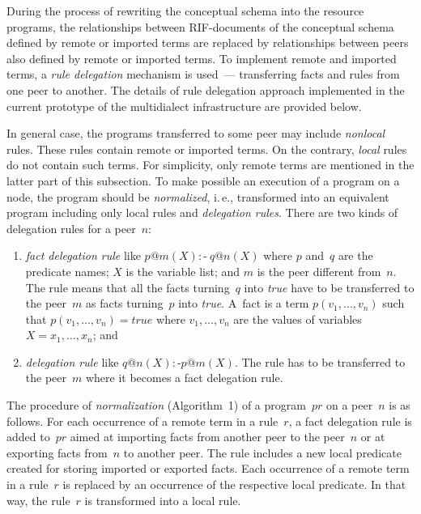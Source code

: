\begin{multicols}{2}
  During the process of rewriting the conceptual schema into the resource
programs, the relationships between RIF-documents of the conceptual schema defined
by remote or imported terms are replaced by relationships between peers also defined
by remote or imported terms. To implement remote and imported terms, a \textit{rule
delegation} mechanism is used~--- transferring facts and rules from one peer to
another. The details of rule delegation approach implemented in the current prototype
of the multidialect infrastructure are provided below.

  In general case, the programs transferred to some peer may include
\textit{nonlocal} rules. These rules contain remote or imported terms. On the
contrary, \textit{local} rules do not contain such terms. For simplicity, only remote
terms are mentioned in the latter part of this subsection. To make possible an execution
of a program on a node, the program should be \textit{normalized}, i.\,e., transformed
into an equivalent program including only local rules and \textit{delegation rules}.
There are two kinds of delegation rules for a peer~$n$:
  \begin{enumerate}[(1)]
\item \textit{fact delegation rule} like $p@m(X) :\mbox{-}\ q@n(X)$ where $p$ and~$q$
are the predicate names; $X$ is the variable list; and $m$ is the
peer different from~$n$. The rule
means that all the facts turning~$q$ into \textit{true} have to be transferred to the
peer~$m$ as facts turning~$p$ into \textit{true}. A~fact is a term $p(v_1,\ldots , v_n)$
such that $p(v_1,\ldots , v_n) = true$ where $v_1,\ldots , v_n$ are the values of
variables~$X = x_1, \ldots , x_n$; and
\item \textit{delegation rule} like $q@n(X) :\mbox{-} p@m(X)$. The rule has to be
transferred to the peer~$m$ where it becomes a fact delegation rule.
\end{enumerate}

  The procedure of \textit{normalization} (Algorithm~1) of a program~$pr$ on a
peer~$n$ is as follows. For each occurrence of a remote term in a rule~$r$, a fact
delegation rule is added to~$pr$ aimed at importing facts from another peer to the
peer~$n$ or at exporting facts from~$n$ to another peer. The rule includes a new
local predicate created for storing imported or exported facts. Each occurrence of a
remote term in a rule~$r$ is replaced by an occurrence of the respective local
predicate. In that way, the rule~$r$ is transformed into a local rule.


\end{multicols}
